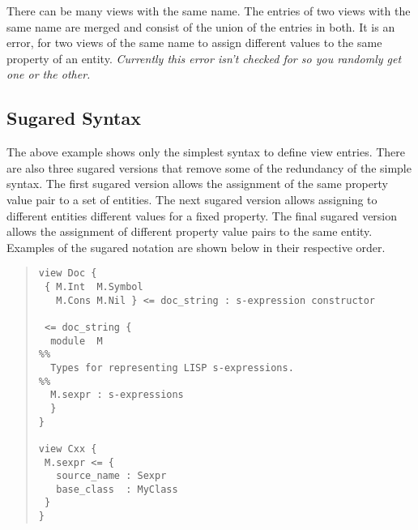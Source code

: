 There can be many views with the same name. The entries of two views
with the same name are merged and consist of the union of the entries
in both. It is an error, for two views of the same name to assign
different values to the same property of an entity. \emph{Currently
this error isn't checked for so you randomly get one or the other.}

\subsection{Sugared Syntax}
The above example shows only the simplest syntax to define view entries.
There are also three sugared versions that remove some of the redundancy of the simple
syntax. The first sugared version allows the assignment of the same
property value pair to a set of entities. The next sugared version allows
assigning to different entities different values for a fixed property.
The final sugared version allows the assignment of different property
value pairs to the same entity. Examples of the sugared notation are shown
below in their respective order.
\begin{quote}\begin{lstlisting}[language=ASDL]
view Doc {
 { M.Int  M.Symbol  
   M.Cons M.Nil } <= doc_string : s-expression constructor

 <= doc_string {
  module  M 
%%
  Types for representing LISP s-expressions.
%%
  M.sexpr : s-expressions 
  }
}

view Cxx {
 M.sexpr <= {
   source_name : Sexpr
   base_class  : MyClass
 }
}
\end{lstlisting}\end{quote}%

